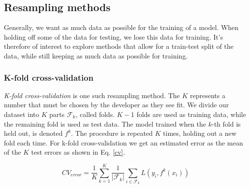 




\subsection{Resampling methods}

Generally, we want as much data as possible for the training of a model. When holding off some of the data for testing, we lose this data for training. It's therefore of interest to explore methods that allow for a train-test split of the data, while still keeping as much data as possible for training. 

\subsubsection{K-fold cross-validation}
\textit{K-fold cross-validation} is one such resampling method. The $K$ represents a number that must be chosen by the developer as they see fit. We divide our dataset into $K$ parts $\mathcal{F}_k$, called folds. $K-1$ folds are used as training data, while the remaining fold is used as test data. The model trained when the $k$-th fold is held out, is denoted $f^{k}$. 
The procedure is repeated $K$ times, holding out a new fold each time. For k-fold cross-validation we get an estimated error as the mean of the $K$ test errors as shown in Eq. \ref{cv}. \citep[p. 241]{hastie}


\begin{equation}\label{cv}
    CV_{error} = \frac{1}{K} \sum_{k=1}^{K} \frac{1}{|\mathcal{F}_k|} \sum_{i \in \mathcal{F}_k} L\left(y_i, f^{k}({x}_i)\right) 
\end{equation}

